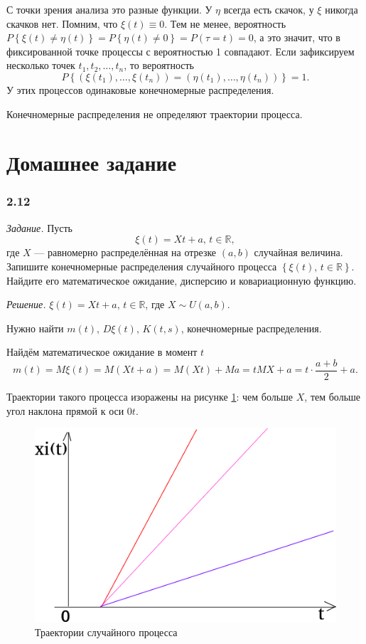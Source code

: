 С точки зрения анализа это разные функции.
У $ \eta $ всегда есть скачок, у $ \xi $ никогда скачков нет.
Помним, что $ \xi \left( t \right) \equiv 0$.
Тем не менее, вероятность
$P \left\{ \xi \left( t \right) \neq \eta \left( t \right) \right\} =
  P \left\{ \eta \left( t \right) \neq 0 \right\} =
  P \left( \tau = t \right) =
  0$,
а это значит, что в фиксированной точке процессы с вероятностью 1 совпадают.
Если зафиксируем несколько точек $t_1, t_2, \dotsc, t_n$, то вероятность
$$P \left\{
    \left( \xi \left( t_1 \right), \dotsc, \xi \left( t_n \right) \right) =
    \left( \eta \left( t_1 \right), \dotsc, \eta \left( t_n \right) \right) \right\} =
  1.$$
У этих процессов одинаковые конечномерные распределения.

Конечномерные распределения не определяют траектории процесса.

\section*{Домашнее задание}

\subsubsection*{2.12}

\textit{Задание.}
Пусть
$$ \xi \left( t \right) =
  Xt + a, \,
  t \in \mathbb{R},$$
где $X$ --- равномерно распределённая на отрезке $ \left( a, b \right) $ случайная величина.
Запишите конечномерные распределения случайного процесса
$ \left\{ \xi \left( t \right), \, t \in \mathbb{R} \right\} $.
Найдите его математическое ожидание, дисперсию и ковариационную функцию.

\textit{Решение.}
$ \xi \left( t \right) = Xt + a, \, t \in \mathbb{R}$, где $X \sim U \left( a, b \right) $.

Нужно найти $m \left( t \right), \, D \xi \left( t \right), \, K \left( t, s \right) $,
конечномерные распределения.

Найдём математическое ожидание в момент $t$
$$m \left( t \right) =
  M \xi \left( t \right) =
  M \left( Xt + a \right) =
  M \left( Xt \right) + Ma =
  tMX + a =
  t \cdot \frac{a + b}{2} + a.$$

Траектории такого процесса изоражены на рисунке \ref{fig:212}: чем больше $X$,
тем больше угол наклона прямой к оси $0t$.

\begin{figure}[h!]
 \centering
 \includegraphics[width=.5\textwidth]{./pictures/2_12.png}
 \caption{Траектории случайного процесса}
 \label{fig:212}
\end{figure}

